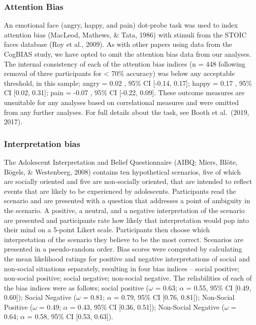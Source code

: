 \documentclass[man,floatsintext]{apa6}
\begin{document}
\hypertarget{attention-bias}{%
\subsubsection{Attention Bias}\label{attention-bias}}

An emotional face (angry, happy, and pain) dot-probe task was used to index attention bias (MacLeod, Mathews, \& Tata, 1986) with stimuli from the STOIC faces database (Roy et al., 2009). As with other papers using data from the CogBIAS study, we have opted to omit the attention bias data from our analyses. The internal consistency of each of the attention bias indices (n = 448 following removal of three participants for \textless{} 70\% accuracy) was below any acceptable threshold, in this sample; angry = 0.02 , 95\% CI {[}-0.14, 0.17{]}; happy = 0.17 , 95\% CI {[}0.02, 0.31{]}; pain = -0.07 , 95\% CI {[}-0.22, 0.09{]}. These outcome measures are unsuitable for any analyses based on correlational measures and were omitted from any further analyses. For full details about the task, see Booth et al.~(2019, 2017).

\hypertarget{interpretation-bias}{%
\subsubsection{Interpretation bias}\label{interpretation-bias}}

The Adolescent Interpretation and Belief Questionnaire (AIBQ; Miers, Blöte, Bögels, \& Westenberg, 2008) contains ten hypothetical scenarios, five of which are socially oriented and five are non-socially oriented, that are intended to reflect events that are likely to be experienced by adolescents. Participants read the scenario and are presented with a question that addresses a point of ambiguity in the scenario. A positive, a neutral, and a negative interpretation of the scenario are presented and participants rate how likely that interpretation would pop into their mind on a 5-point Likert scale. Participants then choose which interpretation of the scenario they believe to be the most correct. Scenarios are presented in a pseudo-random order. Bias scores were computed by calculating the mean likelihood ratings for positive and negative interpretations of social and non-social situations separately, resulting in four bias indices -- social positive; non-social positive; social negative; non-social negative. The reliabilities of each of the bias indices were as follows; social positive (\(\omega\) = 0.63; \(\alpha\) = 0.55, 95\% CI {[}0.49, 0.60{]}); Social Negative (\(\omega\) = 0.81; \(\alpha\) = 0.79, 95\% CI {[}0.76, 0.81{]}); Non-Social Positive (\(\omega\) = 0.49; \(\alpha\) = 0.43, 95\% CI {[}0.36, 0.51{]}); Non-Social Negative (\(\omega\) = 0.64; \(\alpha\) = 0.58, 95\% CI {[}0.53, 0.63{]}).
\end{document}
